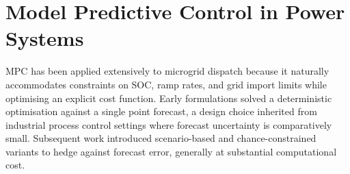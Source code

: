 \section{Model Predictive Control in Power Systems}

MPC has been applied extensively to microgrid dispatch because it naturally accommodates constraints on SOC, ramp rates, and grid import limits while optimising an explicit cost function. Early formulations solved a deterministic optimisation against a single point forecast, a design choice inherited from industrial process control settings where forecast uncertainty is comparatively small. Subsequent work introduced scenario-based and chance-constrained variants to hedge against forecast error, generally at substantial computational cost.
